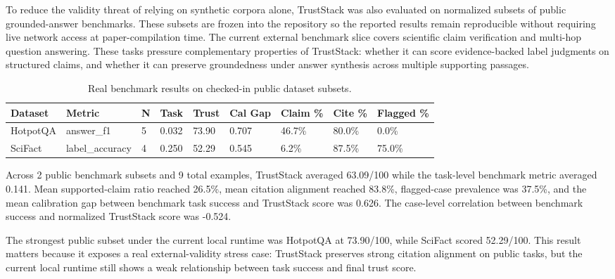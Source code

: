 To reduce the validity threat of relying on synthetic corpora alone, TrustStack was also evaluated on normalized subsets of public grounded-answer benchmarks. These subsets are frozen into the repository so the reported results remain reproducible without requiring live network access at paper-compilation time.
The current external benchmark slice covers scientific claim verification and multi-hop question answering. These tasks pressure complementary properties of TrustStack: whether it can score evidence-backed label judgments on structured claims, and whether it can preserve groundedness under answer synthesis across multiple supporting passages.

\begin{table}[t]
\centering
\caption{Real benchmark results on checked-in public dataset subsets.}
\label{tab:real-benchmark-results}
\renewcommand{\arraystretch}{1.08}
\footnotesize
\begin{tabular}{@{}L{0.11\textwidth}L{0.10\textwidth}C{0.05\textwidth}C{0.08\textwidth}C{0.08\textwidth}C{0.08\textwidth}C{0.09\textwidth}C{0.09\textwidth}C{0.09\textwidth}@{}}
\hline
{}\textbf{Dataset} & \textbf{Metric} & \textbf{N} & \textbf{Task} & \textbf{Trust} & \textbf{Cal Gap} & \textbf{Claim \%} & \textbf{Cite \%} & \textbf{Flagged \%} \\
\hline
HotpotQA & answer\_f1 & 5 & 0.032 & 73.90 & 0.707 & 46.7\% & 80.0\% & 0.0\% \\
SciFact & label\_accuracy & 4 & 0.250 & 52.29 & 0.545 & 6.2\% & 87.5\% & 75.0\% \\
\hline
\end{tabular}
\end{table}

Across 2 public benchmark subsets and 9 total examples, TrustStack averaged 63.09/100 while the task-level benchmark metric averaged 0.141. Mean supported-claim ratio reached 26.5\%, mean citation alignment reached 83.8\%, flagged-case prevalence was 37.5\%, and the mean calibration gap between benchmark task success and TrustStack score was 0.626. The case-level correlation between benchmark success and normalized TrustStack score was -0.524.

The strongest public subset under the current local runtime was HotpotQA at 73.90/100, while SciFact scored 52.29/100. This result matters because it exposes a real external-validity stress case: TrustStack preserves strong citation alignment on public tasks, but the current local runtime still shows a weak relationship between task success and final trust score.

